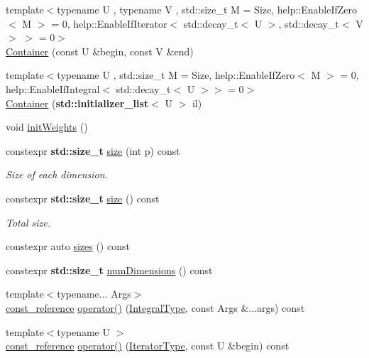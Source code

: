 \begin{DoxyCompactItemize}
{\footnotesize template$<$typename U , typename V , std\+::size\+\_\+t M = Size, help\+::\+Enable\+If\+Zero$<$ M $>$  = 0, help\+::\+Enable\+If\+Iterator$<$ std\+::decay\+\_\+t$<$ U $>$, std\+::decay\+\_\+t$<$ V $>$ $>$  = 0$>$ }\\\hyperlink{classcnt_1_1help_1_1Container_a7f6bc5fa04c8d13035afa70451f284ba}{Container} (const U \&begin, const V \&end)
\item 
{\footnotesize template$<$typename U , std\+::size\+\_\+t M = Size, help\+::\+Enable\+If\+Zero$<$ M $>$  = 0, help\+::\+Enable\+If\+Integral$<$ std\+::decay\+\_\+t$<$ U $>$$>$  = 0$>$ }\\\hyperlink{classcnt_1_1help_1_1Container_ae224bd9d879e6d4a64c5c8012f37e118}{Container} ({\bf std\+::initializer\+\_\+list}$<$ U $>$ il)
\item 
void \hyperlink{classcnt_1_1help_1_1Container_abf2fe8cb94e2f888a13a3012326aa85e}{init\+Weights} ()
\item 
constexpr {\bf std\+::size\+\_\+t} \hyperlink{classcnt_1_1help_1_1Container_a90bd1c3efe449d1f05ac28c443f0b8d8}{size} (int p) const 
\begin{DoxyCompactList}\small\item\em Size of each dimension. \end{DoxyCompactList}\item 
constexpr {\bf std\+::size\+\_\+t} \hyperlink{classcnt_1_1help_1_1Container_a02a5c3d38936e4b929e20fa367600495}{size} () const 
\begin{DoxyCompactList}\small\item\em Total size. \end{DoxyCompactList}\item 
constexpr auto \hyperlink{classcnt_1_1help_1_1Container_a08be97b830ab4e6fa1f619c6be405681}{sizes} () const 
\item 
constexpr {\bf std\+::size\+\_\+t} \hyperlink{classcnt_1_1help_1_1Container_a59a40323af244d48fd2dabf2d3b1313a}{num\+Dimensions} () const 
\end{DoxyCompactItemize}
{\bf }\par
\begin{DoxyCompactItemize}
\item 
{\footnotesize template$<$typename... Args$>$ }\\\hyperlink{classcnt_1_1help_1_1Container_a388ebfcebe3759453a569af7d57267b5}{const\+\_\+reference} \hyperlink{classcnt_1_1help_1_1Container_a3f9e15cd0863d4f954b5d5e810913866}{operator()} (\hyperlink{structcnt_1_1help_1_1IntegralType}{Integral\+Type}, const Args \&...args) const 
\item 
{\footnotesize template$<$typename U $>$ }\\\hyperlink{classcnt_1_1help_1_1Container_a388ebfcebe3759453a569af7d57267b5}{const\+\_\+reference} \hyperlink{classcnt_1_1help_1_1Container_ac0bfad14c0d0fe9ab0d8cf61530ea5e9}{operator()} (\hyperlink{structcnt_1_1help_1_1IteratorType}{Iterator\+Type}, const U \&begin) const 
\end{DoxyCompactItemize}

